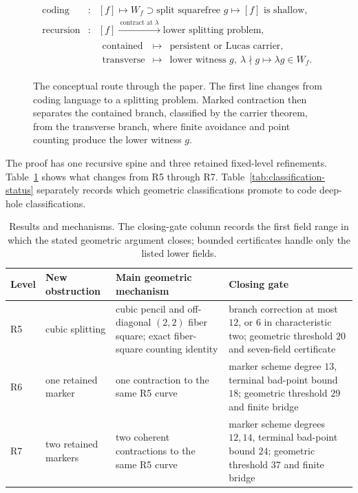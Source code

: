 \begin{figure}[H]
\centering
\[
\begin{array}{rcl}
\text{coding}
 &:& [f]\longmapsto W_f\supset\text{split squarefree }g
      \longmapsto [f]\text{ is shallow},\\[4pt]
\text{recursion}
 &:& [f]\xrightarrow{\ \text{contract at }\lambda\ }
      \text{lower splitting problem},\\[2pt]
&&\begin{array}{rcl}
\text{contained}&\longmapsto&\text{persistent or Lucas carrier},\\
\text{transverse}&\longmapsto&
 \text{lower witness }g,\ \lambda\nmid g
 \longmapsto \lambda g\in W_f .
\end{array}
\end{array}
\]
\caption{The conceptual route through the paper.  The first line changes
from coding language to a splitting problem.  Marked contraction then
separates the contained branch, classified by the carrier theorem, from the
transverse branch, where finite avoidance and point counting produce the
lower witness \(g\).}
\label{fig:polar-flow}
\end{figure}

The proof has one recursive spine and three retained fixed-level refinements.
Table~\ref{tab:dependency-map} shows what changes from R5 through R7.
Table~\ref{tab:classification-status} separately records which geometric
classifications promote to code deep-hole classifications.

\begin{table}[H]
\centering
\small
\caption{Results and mechanisms.  The closing-gate column records the first
field range in which the stated geometric argument closes; bounded
certificates handle only the listed lower fields.}
\label{tab:dependency-map}
\setlength{\tabcolsep}{3pt}
\begin{tabular}{p{}p{}p{}
                p{}}
\toprule
Level & New obstruction & Main geometric mechanism & Closing gate\\
\midrule
R5 & cubic splitting & cubic pencil and off-diagonal \((2,2)\) fiber square;
exact fiber-square counting identity & branch correction at most \(12\), or \(6\) in
characteristic two; geometric threshold \(20\) and seven-field certificate\\
R6 & one retained marker & one contraction to the same R5 curve & marker
scheme degree \(13\), terminal bad-point bound \(18\); geometric threshold
\(29\) and finite bridge\\
R7 & two retained markers & two coherent contractions to the same R5 curve &
marker scheme degrees \(12,14\), terminal bad-point bound \(24\); geometric
threshold \(37\) and finite bridge\\
\bottomrule
\end{tabular}
\end{table}

